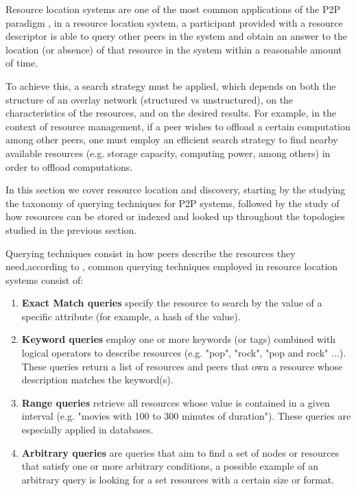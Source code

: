 

Resource location systems are one of the most common applications of the P2P paradigm \cite{leitaoPHDthesis}, in a resource location system, a participant provided with a resource descriptor is able to query other peers in the system and obtain an answer to the location (or absence) of that resource in the system within a reasonable amount of time.

To achieve this, a search strategy must be applied, which depends on both the structure of an overlay network (structured vs unstructured), on the characteristics of the resources, and on the desired results. For example, in the context of resource management, if a peer wishes to offload a certain computation among other peers, one must employ an efficient search strategy to find nearby available resources (e.g. storage capacity, computing power, among others) in order to offload computations.

In this section we cover resource location and discovery, starting by the studying the taxonomy of querying techniques for P2P systems, followed by the study of how resources can be stored or indexed and looked up throughout the topologies studied in the previous section.

Querying techniques consist in how peers describe the resources they need,according to \cite{leitaoPHDthesis}, common querying techniques employed in resource location systems consist of:

\begin{enumerate}
    \item \textbf{Exact Match queries} specify the resource to search by the value of a specific attribute (for example, a hash of the value).

    \item \textbf{Keyword queries} employ one or more keywords (or tags) combined with logical operators to describe resources (e.g. "pop", "rock", "pop and rock" ...). These queries return a list of resources and peers that own a resource whose description matches the keyword(s).
    
    \item \textbf{Range queries} retrieve all resources whose value is contained in a given interval (e.g. "movies with 100 to 300 minutes of duration"). These queries are especially applied in databases.
    
    \item \textbf{Arbitrary queries} are queries that aim to find a set of nodes or resources that satisfy one or more arbitrary conditions, a possible example of an arbitrary query is looking for a set resources with a certain size or format.
    
\end{enumerate}

